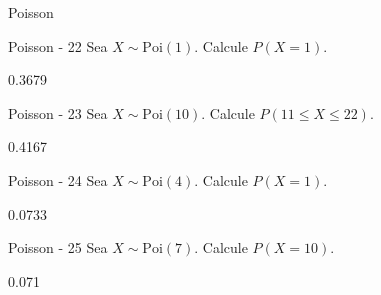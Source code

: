 \documentclass[a4,11pt]{aleph-notas}
\newcommand{\Poi}{\text{Poi}}
\begin{document}
\begin{quiz}{Poisson}
\begin{numerical}[tolerance=0.001]%
    {Poisson - 22}
    Sea \( X \sim \Poi(1) \). Calcule \( P(X = 1) \).
    \item[] 0.3679
\end{numerical}

\begin{numerical}[tolerance=0.001]%
    {Poisson - 23}
    Sea \( X \sim \Poi(10) \). Calcule \( P(11 \leq X \leq 22) \).
    \item[] 0.4167
\end{numerical}

\begin{numerical}[tolerance=0.001]%
    {Poisson - 24}
    Sea \( X \sim \Poi(4) \). Calcule \( P(X = 1) \).
    \item[] 0.0733
\end{numerical}

\begin{numerical}[tolerance=0.001]%
    {Poisson - 25}
    Sea \( X \sim \Poi(7) \). Calcule \( P(X = 10) \).
    \item[] 0.071
\end{numerical}




\end{quiz}
\end{document}
